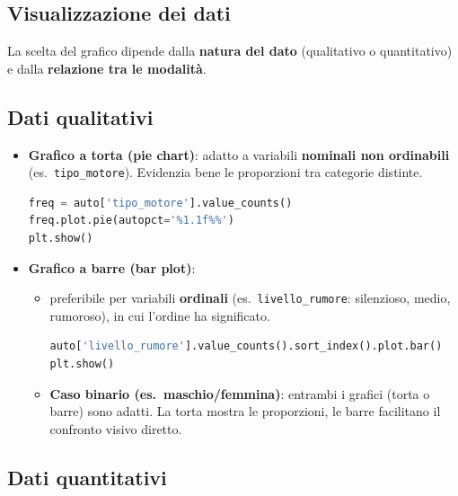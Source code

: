 \documentclass{article}
\begin{document}
\subsection*{Visualizzazione dei dati}

La scelta del grafico dipende dalla \textbf{natura del dato} (qualitativo o quantitativo) e dalla \textbf{relazione tra le modalità}.

\subsection*{Dati qualitativi}

\begin{itemize}
  \item \textbf{Grafico a torta (pie chart)}: adatto a variabili \textbf{nominali non ordinabili} (es.\ \texttt{tipo\_motore}). Evidenzia bene le proporzioni tra categorie distinte.
  \begin{lstlisting}[language=Python]
freq = auto['tipo_motore'].value_counts()
freq.plot.pie(autopct='%1.1f%%')
plt.show()
  \end{lstlisting}

  \item \textbf{Grafico a barre (bar plot)}: 
  
  \begin{itemize}
    \item preferibile per variabili \textbf{ordinali} (es.\ \texttt{livello\_rumore}: silenzioso, medio, rumoroso), in cui l'ordine ha significato.
  \begin{lstlisting}[language=Python]
auto['livello_rumore'].value_counts().sort_index().plot.bar()
plt.show()
  \end{lstlisting}
  \item \textbf{Caso binario (es.\ maschio/femmina)}: entrambi i grafici (torta o barre) sono adatti. La torta mostra le proporzioni, le barre facilitano il confronto visivo diretto.
  \end{itemize}
\end{itemize}

\subsection*{Dati quantitativi}
\end{document}
